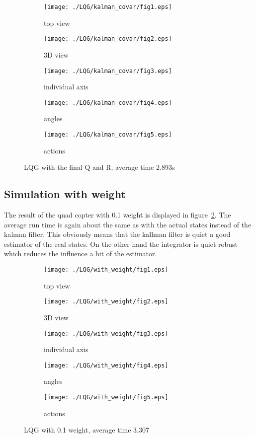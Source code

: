 \begin{figure}[H]
	\centering
	\begin{subfigure}[b]{0.3\textwidth}
		\texttt{[image: ./LQG/kalman\_covar/fig1.eps]}
		\caption{top view}
	\end{subfigure}
	\begin{subfigure}[b]{0.3\textwidth}
		\texttt{[image: ./LQG/kalman\_covar/fig2.eps]}
		\caption{3D view}
	\end{subfigure}
	\begin{subfigure}[b]{0.3\textwidth}
		\texttt{[image: ./LQG/kalman\_covar/fig3.eps]}
		\caption{individual axis}
	\end{subfigure}
	\begin{subfigure}[b]{0.3\textwidth}
		\texttt{[image: ./LQG/kalman\_covar/fig4.eps]}
		\caption{angles}
	\end{subfigure}
	\begin{subfigure}[b]{0.3\textwidth}
		\texttt{[image: ./LQG/kalman\_covar/fig5.eps]}
		\caption{actions}
	\end{subfigure}
	\caption{LQG with the final Q and R, average time 2.893s}\label{fig:LQG without weight final}
\end{figure}


\subsection{Simulation with weight}
The result of the quad copter with 0.1 weight is displayed in figure~\ref{fig:LQG with weight}. The average run time is again about the same as with the actual states instead of the kalman filter. This obviously means that the kallman filter is quiet a good estimator of the real states. On the other hand the integrator is quiet robust which reduces the influence a bit of the estimator.
\begin{figure}[H]
	\centering
	\begin{subfigure}[b]{0.3\textwidth}
		\texttt{[image: ./LQG/with\_weight/fig1.eps]}
		\caption{top view}
	\end{subfigure}
	\begin{subfigure}[b]{0.3\textwidth}
		\texttt{[image: ./LQG/with\_weight/fig2.eps]}
		\caption{3D view}
	\end{subfigure}
	\begin{subfigure}[b]{0.3\textwidth}
		\texttt{[image: ./LQG/with\_weight/fig3.eps]}
		\caption{individual axis}
	\end{subfigure}
	\begin{subfigure}[b]{0.3\textwidth}
		\texttt{[image: ./LQG/with\_weight/fig4.eps]}
		\caption{angles}
	\end{subfigure}
	\begin{subfigure}[b]{0.3\textwidth}
		\texttt{[image: ./LQG/with\_weight/fig5.eps]}
		\caption{actions}
	\end{subfigure}
	\caption{LQG with 0.1 weight, average time 3.307}\label{fig:LQG with weight}
\end{figure}